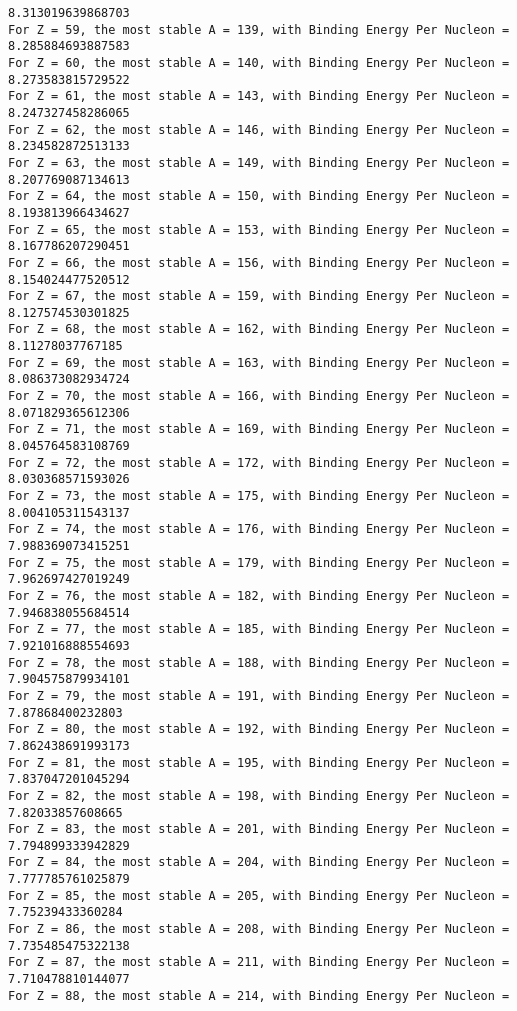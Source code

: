\documentclass[11pt]{article}
\begin{document}
\begin{Verbatim}[commandchars=\\\{\}]
8.313019639868703
For Z = 59, the most stable A = 139, with Binding Energy Per Nucleon =
8.285884693887583
For Z = 60, the most stable A = 140, with Binding Energy Per Nucleon =
8.273583815729522
For Z = 61, the most stable A = 143, with Binding Energy Per Nucleon =
8.247327458286065
For Z = 62, the most stable A = 146, with Binding Energy Per Nucleon =
8.234582872513133
For Z = 63, the most stable A = 149, with Binding Energy Per Nucleon =
8.207769087134613
For Z = 64, the most stable A = 150, with Binding Energy Per Nucleon =
8.193813966434627
For Z = 65, the most stable A = 153, with Binding Energy Per Nucleon =
8.167786207290451
For Z = 66, the most stable A = 156, with Binding Energy Per Nucleon =
8.154024477520512
For Z = 67, the most stable A = 159, with Binding Energy Per Nucleon =
8.127574530301825
For Z = 68, the most stable A = 162, with Binding Energy Per Nucleon =
8.11278037767185
For Z = 69, the most stable A = 163, with Binding Energy Per Nucleon =
8.086373082934724
For Z = 70, the most stable A = 166, with Binding Energy Per Nucleon =
8.071829365612306
For Z = 71, the most stable A = 169, with Binding Energy Per Nucleon =
8.045764583108769
For Z = 72, the most stable A = 172, with Binding Energy Per Nucleon =
8.030368571593026
For Z = 73, the most stable A = 175, with Binding Energy Per Nucleon =
8.004105311543137
For Z = 74, the most stable A = 176, with Binding Energy Per Nucleon =
7.988369073415251
For Z = 75, the most stable A = 179, with Binding Energy Per Nucleon =
7.962697427019249
For Z = 76, the most stable A = 182, with Binding Energy Per Nucleon =
7.946838055684514
For Z = 77, the most stable A = 185, with Binding Energy Per Nucleon =
7.921016888554693
For Z = 78, the most stable A = 188, with Binding Energy Per Nucleon =
7.904575879934101
For Z = 79, the most stable A = 191, with Binding Energy Per Nucleon =
7.87868400232803
For Z = 80, the most stable A = 192, with Binding Energy Per Nucleon =
7.862438691993173
For Z = 81, the most stable A = 195, with Binding Energy Per Nucleon =
7.837047201045294
For Z = 82, the most stable A = 198, with Binding Energy Per Nucleon =
7.82033857608665
For Z = 83, the most stable A = 201, with Binding Energy Per Nucleon =
7.794899333942829
For Z = 84, the most stable A = 204, with Binding Energy Per Nucleon =
7.777785761025879
For Z = 85, the most stable A = 205, with Binding Energy Per Nucleon =
7.75239433360284
For Z = 86, the most stable A = 208, with Binding Energy Per Nucleon =
7.735485475322138
For Z = 87, the most stable A = 211, with Binding Energy Per Nucleon =
7.710478810144077
For Z = 88, the most stable A = 214, with Binding Energy Per Nucleon =

\end{Verbatim}
\end{document}
